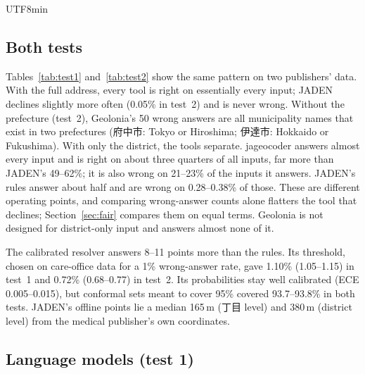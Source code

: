 \documentclass[10pt]{article}
\begin{document}
\begin{CJK}{UTF8}{min}
\subsection{Both tests}
Tables~\ref{tab:test1} and~\ref{tab:test2} show the same pattern on two publishers' data. With the full
address, every tool is right on essentially every input; JADEN declines slightly more often (0.05\% in
test~2) and is never wrong. Without the prefecture (test~2), Geolonia's 50 wrong answers are all
municipality names that exist in two prefectures (府中市: Tokyo or Hiroshima; 伊達市: Hokkaido or
Fukushima). With only the district, the tools separate. jageocoder answers almost every input and is
right on about three quarters of all inputs, far more than JADEN's 49--62\%; it is also wrong on 21--23\%
of the inputs it answers. JADEN's rules answer about half and are wrong on 0.28--0.38\% of those. These
are different operating points, and comparing wrong-answer counts alone flatters the tool that declines;
Section~\ref{sec:fair} compares them on equal terms. Geolonia is not designed for district-only input and
answers almost none of it.

The calibrated resolver answers 8--11 points more than the rules. Its threshold, chosen on care-office
data for a 1\% wrong-answer rate, gave 1.10\% (1.05--1.15) in test~1 and 0.72\% (0.68--0.77) in test~2.
Its probabilities stay well calibrated (ECE 0.005--0.015), but conformal sets meant to cover 95\% covered
93.7--93.8\% in both tests. JADEN's offline points lie a median 165\,m (丁目 level) and 380\,m
(district level) from the medical publisher's own coordinates.

\subsection{Language models (test 1)}\label{sec:llmres}


\end{CJK}
\end{document}
